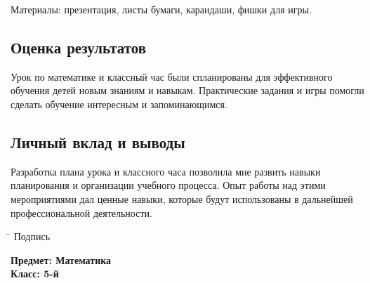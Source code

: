 \documentclass[a4paper,12pt]{article}
\begin{document}
Материалы: презентация, листы бумаги, карандаши, фишки для игры.

\subsection*{Оценка результатов}

Урок по математике и классный час были спланированы для эффективного обучения детей новым знаниям и навыкам. Практические задания и игры помогли сделать обучение интересным и запоминающимся.

\subsection*{Личный вклад и выводы}

Разработка плана урока и классного часа позволила мне развить навыки планирования и организации учебного процесса. Опыт работы над этими мероприятиями дал ценные навыки, которые будут использованы в дальнейшей профессиональной деятельности.

\noindent
\begin{tabbing}
\hspace{2cm} \= \kill
Подпись \> \underline{\hspace{4cm}}
\end{tabbing}

\vspace{5mm}

\noindent
\textbf{Предмет: Математика}\\
\textbf{Класс: 5-й}\\
\end{document}
